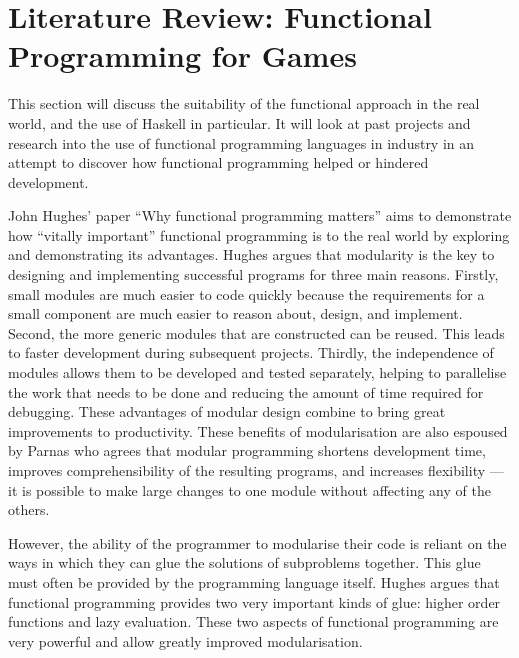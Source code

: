 \section{Literature Review: Functional Programming for Games}
\label{sec:fp_review}

\label{cf:code_organisation} %


This section will discuss the suitability of the functional approach in the real
world, and the use of Haskell in particular. It will look at past projects and
research into the use of functional programming languages in industry in an
attempt to discover how functional programming helped or hindered development.

John Hughes' paper ``Why functional programming matters'' aims to demonstrate how
``vitally important'' functional programming is to the real world by exploring and
demonstrating its advantages.\cite{hughes1989whyfp} Hughes argues that modularity
is the key to designing and implementing successful programs for three main reasons.
Firstly, small modules are much easier to code quickly because the requirements for
a small component are much easier to reason about, design, and implement. Second,
the more generic modules that are constructed can be reused. This leads to faster
development during subsequent projects. Thirdly, the independence of modules allows
them to be developed and tested separately, helping to parallelise the work that needs
to be done and reducing the amount of time required for debugging. These advantages
of modular design combine to bring great improvements to productivity. These benefits
of modularisation are also espoused by Parnas who agrees that modular programming
shortens development time, improves comprehensibility of the resulting programs,
and increases flexibility --- it is possible to make large changes to one module
without affecting any of the others.\cite{parnas1972modular}

However, the ability of the programmer to modularise their code is reliant on the
ways in which they can glue the solutions of subproblems together. This glue must
often be provided by the programming language itself. Hughes argues that functional
programming provides two very important kinds of glue: higher order functions
and lazy evaluation. These two aspects of functional programming are very powerful
and allow greatly improved modularisation.

